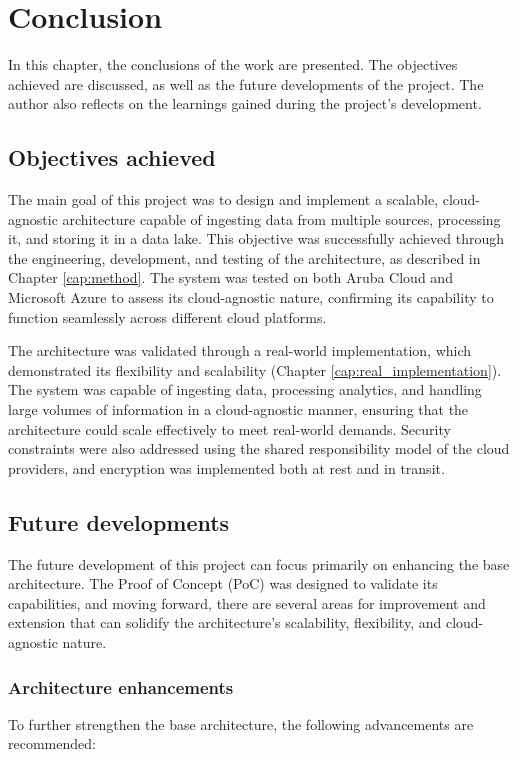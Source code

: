   \chapter{Conclusion}
\label{cap:conclusion}

In this chapter, the conclusions of the work are presented. The objectives achieved are discussed, as well as the future developments of the project. The author also reflects on the learnings gained during the project’s development.

\section{Objectives achieved}

The main goal of this project was to design and implement a scalable, cloud-agnostic architecture capable of ingesting data from multiple sources, processing it, and storing it in a data lake. This objective was successfully achieved through the engineering, development, and testing of the architecture, as described in Chapter \ref{cap:method}. The system was tested on both Aruba Cloud and Microsoft Azure to assess its cloud-agnostic nature, confirming its capability to function seamlessly across different cloud platforms.

The architecture was validated through a real-world implementation, which demonstrated its flexibility and scalability (Chapter \ref{cap:real_implementation}). The system was capable of ingesting data, processing analytics, and handling large volumes of information in a cloud-agnostic manner, ensuring that the architecture could scale effectively to meet real-world demands. Security constraints were also addressed using the shared responsibility model of the cloud providers, and encryption was implemented both at rest and in transit.

\section{Future developments}

The future development of this project can focus primarily on enhancing the base architecture. The Proof of Concept (PoC) was designed to validate its capabilities, and moving forward, there are several areas for improvement and extension that can solidify the architecture’s scalability, flexibility, and cloud-agnostic nature.

\subsection{Architecture enhancements}
To further strengthen the base architecture, the following advancements are recommended:


